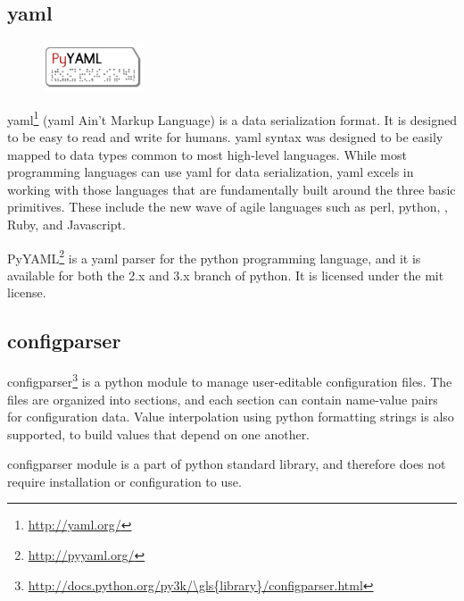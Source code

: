 \subsection{\Gls{yaml}}
\label{sec:pre:yaml}
\begin{figure}
	\vspace{-30pt}
	\includegraphics[width=3cm]{./planning/img/pyyaml_logo}
	\vspace{-30pt}
\end{figure}
\Gls{yaml}\footnote{\url{http://yaml.org/}} (\Gls{yaml} Ain't Markup Language) is a \gls{data serialization} format.
It is designed to be easy to read and write for humans.
\Gls{yaml} syntax was designed to be easily mapped to data types common to most
high-level languages. While most programming languages can use \Gls{yaml} for data
serialization, \Gls{yaml} excels in working with those languages that are
fundamentally built around the three basic primitives. These include the new
wave of agile languages such as \Gls{perl}, \Gls{python}, , \Gls{Ruby}, and \Gls{Javascript}.

PyYAML\footnote{\url{http://pyyaml.org/}} is a \Gls{yaml} \gls{parser} for the \Gls{python}
programming language, and it is available for both the 2.x and 3.x \gls{branch} of
\Gls{python}. It is licensed under the \Gls{mit} license.

\subsection{configparser}
configparser\footnote{\url{http://docs.python.org/py3k/\gls{library}/configparser.html}}
is a \Gls{python} module to manage user-editable configuration files. The
files are organized into sections, and each section can contain name-value
pairs for configuration data. Value interpolation using \Gls{python} formatting
strings is also supported, to build values that depend on one another.

configparser module is a part of \Gls{python} standard \gls{library}, and therefore does
not require installation or configuration to use.

